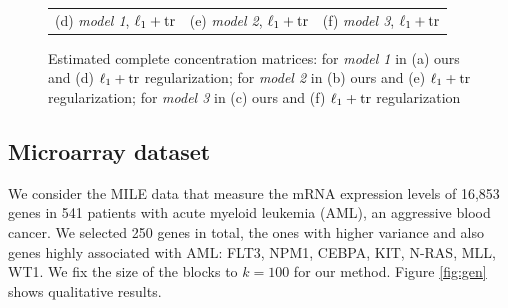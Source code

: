 \begin{figure}
\begin{tabular}{ccc}
   \\    (d)  \textit{model 1}, $\ell_1+\rm tr$ & (e)  \textit{model 2}, $\ell_1+\rm tr$  & (f)  \textit{model 3}, $\ell_1+\rm tr$  \\[6pt]
\end{tabular}
\caption{Estimated complete concentration matrices: for \textit{model 1} in (a) ours and (d) $\ell_1+\rm tr$ regularization; for \textit{model 2} in (b) ours and (e) $\ell_1+\rm tr$ regularization; for \textit{model 3} in (c) ours and (f) $\ell_1+\rm tr$ regularization }
\end{figure}


\subsection{Microarray dataset}

We consider the MILE data \citep{haferlach2010clinical} that measure the mRNA expression levels of 16,853 genes in 541 patients with acute myeloid leukemia (AML), an aggressive blood cancer. We selected 250 genes in total, the ones with higher variance and  also genes highly associated with AML: FLT3, NPM1, CEBPA, KIT, N-RAS, MLL, WT1. We fix the size of the blocks to $k=100$ for our method. Figure \ref{fig:gen} shows qualitative results. 

